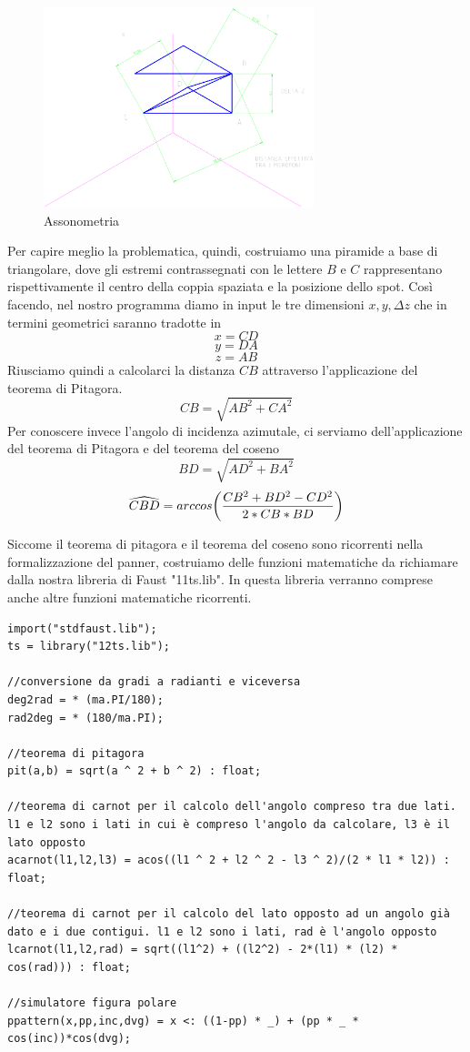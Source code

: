 \documentclass{article}
\begin{document}
    \begin{figure}[H]
        \centering
        \includegraphics[width=0.7\textwidth]{images/Assonometria.png}
         \caption{\label{fig1}Assonometria}
    \end{figure}

    Per capire meglio la problematica, quindi, costruiamo una piramide a base di triangolare, dove gli estremi contrassegnati con le lettere $B$ e $C$ rappresentano rispettivamente il centro della coppia spaziata e la posizione dello spot. Così facendo, nel nostro programma diamo in input le tre dimensioni $x, y, \Delta z$ che in termini geometrici saranno tradotte in
    $$x = CD$$
    $$y = DA$$
    $$z = AB$$
    Riusciamo quindi a calcolarci la distanza $CB$ attraverso l'applicazione del teorema di Pitagora.
    $$CB = \sqrt{AB^2 + CA ^ 2}$$
    Per conoscere invece l'angolo di incidenza azimutale, ci serviamo dell'applicazione del teorema di Pitagora e del teorema del coseno
    $$BD = \sqrt{AD^2 + BA ^ 2}$$
    $$\widehat{CBD} = arccos \biggl( {CB ^ 2 + BD ^ 2 - CD ^ 2\over 2 * CB * BD} \biggr)$$

    Siccome il teorema di pitagora e il teorema del coseno sono ricorrenti nella formalizzazione del panner, costruiamo delle funzioni matematiche da richiamare dalla nostra libreria di Faust "11ts.lib". In questa libreria verranno comprese anche altre funzioni matematiche ricorrenti.
    
    \begin{lstlisting}
import("stdfaust.lib");
ts = library("12ts.lib");

//conversione da gradi a radianti e viceversa
deg2rad = * (ma.PI/180);
rad2deg = * (180/ma.PI);

//teorema di pitagora
pit(a,b) = sqrt(a ^ 2 + b ^ 2) : float;

//teorema di carnot per il calcolo dell'angolo compreso tra due lati. l1 e l2 sono i lati in cui è compreso l'angolo da calcolare, l3 è il lato opposto
acarnot(l1,l2,l3) = acos((l1 ^ 2 + l2 ^ 2 - l3 ^ 2)/(2 * l1 * l2)) : float;

//teorema di carnot per il calcolo del lato opposto ad un angolo già dato e i due contigui. l1 e l2 sono i lati, rad è l'angolo opposto
lcarnot(l1,l2,rad) = sqrt((l1^2) + ((l2^2) - 2*(l1) * (l2) * cos(rad))) : float;

//simulatore figura polare
ppattern(x,pp,inc,dvg) = x <: ((1-pp) * _) + (pp * _ * cos(inc))*cos(dvg);
    \end{lstlisting}
    
\end{document}
